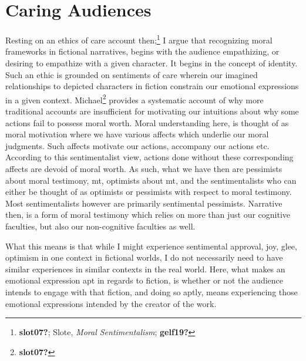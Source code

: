 \documentclass[
  12pt,
]{book}
\theoremstyle{definition}
\theoremstyle{definition}
\theoremstyle{definition}
\theoremstyle{definition}
\theoremstyle{remark}
\begin{document}
\section{Caring Audiences}\label{caring-audiences}

Resting on an ethics of care account then;\footnote{\textbf{slot07?}; Slote, \emph{Moral {Sentimentalism}}; \textbf{gelf19?}} I argue that recognizing moral frameworks in fictional narratives, begins with the audience empathizing, or desiring to empathize with a given character. It begins in the concept of identity. Such an ethic is grounded on sentiments of care wherein our imagined relationships to depicted characters in fiction constrain our emotional expressions in a given context. Michael\footnote{\textbf{slot07?}} provides a systematic account of why more traditional accounts are insufficient for motivating our intuitions about why some actions fail to possess moral worth. Moral understanding here, is thought of as moral motivation where we have various affects which underlie our moral judgments. Such affects motivate our actions, accompany our actions etc. According to this sentimentalist view, actions done without these corresponding affects are devoid of moral worth. As such, what we have then are pessimists about moral testimony, mt, optimists about mt, and the sentimentalists who can either be thought of as optimists or pessimists with respect to moral testimony. Most sentimentalists however are primarily sentimental pessimists. Narrative then, is a form of moral testimony which relies on more than just our cognitive faculties, but also our non-cognitive faculties as well.

What this means is that while I might experience sentimental approval, joy, glee, optimism in one context in fictional worlds, I do not necessarily need to have similar experiences in similar contexts in the real world. Here, what makes an emotional expression apt in regards to fiction, is whether or not the audience intends to engage with that fiction, and doing so aptly, means experiencing those emotional expressions intended by the creator of the work.
\end{document}

